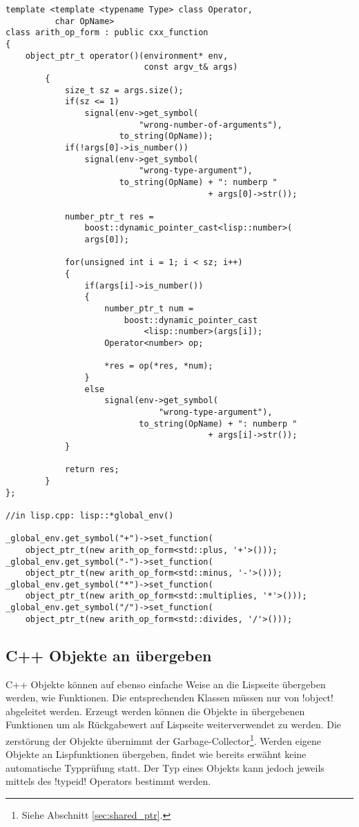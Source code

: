 \begin{lstlisting}[caption={Arithmetische Operatoren an Lisp übergeben}, label=lst:cxx_function]
template <template <typename Type> class Operator,
          char OpName>
class arith_op_form : public cxx_function
{
    object_ptr_t operator()(environment* env,
                            const argv_t& args)
        {
            size_t sz = args.size();
            if(sz <= 1)
                signal(env->get_symbol(
                           "wrong-number-of-arguments"),
                       to_string(OpName));
            if(!args[0]->is_number())
                signal(env->get_symbol(
                           "wrong-type-argument"),
                       to_string(OpName) + ": numberp "
                                         + args[0]->str());

            number_ptr_t res = 
                boost::dynamic_pointer_cast<lisp::number>(
                args[0]);

            for(unsigned int i = 1; i < sz; i++)
            {
                if(args[i]->is_number())
                {
                    number_ptr_t num =
                        boost::dynamic_pointer_cast
                            <lisp::number>(args[i]);
                    Operator<number> op;

                    *res = op(*res, *num);
                }
                else
                    signal(env->get_symbol(
                               "wrong-type-argument"),
                           to_string(OpName) + ": numberp "
                                         + args[i]->str());
            }

            return res;
        }
};

//in lisp.cpp: lisp::*global_env()

_global_env.get_symbol("+")->set_function(
    object_ptr_t(new arith_op_form<std::plus, '+'>()));
_global_env.get_symbol("-")->set_function(
    object_ptr_t(new arith_op_form<std::minus, '-'>()));
_global_env.get_symbol("*")->set_function(
    object_ptr_t(new arith_op_form<std::multiplies, '*'>()));
_global_env.get_symbol("/")->set_function(
    object_ptr_t(new arith_op_form<std::divides, '/'>()));
\end{lstlisting}

\subsection{C++ Objekte an \projectname{} übergeben}
\label{sec:cxx_object_interface}

C++ Objekte können auf ebenso einfache Weise an die Lispseite übergeben werden, wie Funktionen. Die entsprechenden Klassen müssen nur von !object! abgeleitet werden. Erzeugt werden können die Objekte in übergebenen Funktionen um als Rückgabewert auf Lispseite weiterverwendet zu werden. Die zerstörung der Objekte übernimmt der Garbage-Collector\footnote{Siehe Abschnitt \ref{sec:shared_ptr}.}. Werden eigene Objekte an Lispfunktionen übergeben, findet wie bereits erwähnt keine automatische Typprüfung statt. Der Typ eines Objekts kann jedoch jeweils mittels des !typeid! Operators bestimmt werden.
